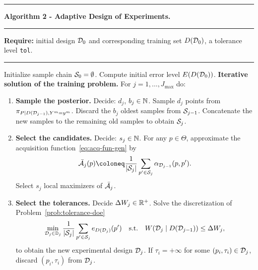 \par\noindent\rule[1mm]{\textwidth}{0.4pt}
 \makeatletter{}\makeatother\label{algo:AL}
\large{\textbf{Algorithm 2 - Adaptive Design of Experiments.} } \normalsize
\par\noindent\rule[2mm]{\textwidth}{0.2pt}
\textbf{Require:} initial design $\mathcal D_0$ and corresponding training set $D(\mathcal D_0)$, a tolerance level \texttt{tol}.
\par\noindent\rule[2mm]{\textwidth}{0.2pt}
Initialize sample chain $\mathcal S_0 = \emptyset$. \newline
Compute initial error level $E(D(\mathcal D_0))$. \newline
\textbf{Iterative solution of the training problem.}
For $j =1, \dots, J_{\max}$ do: 
\begin{enumerate}
    \item \textbf{Sample the posterior.} \newline
    Decide: $d_j$, $b_j \in \mathbb N$. \newline
    Sample $d_j$ points from $\pi_{P \mid D(\mathcal D_{j-1}), Y^m = y^m}$. \newline
    Discard the $b_j$ oldest samples from $\mathcal S_{j-1}$. \newline
    Concatenate the new samples to the remaining old samples to obtain $\mathcal S_j$.

    \item \textbf{Select the candidates.} \newline 
    Decide: $s_j \in \mathbb N$. \newline
    For any $p\in \Theta$, approximate the acquisition function~\ref{eq:acq-fun-gen} by
    \begin{equation}\label{eq:acq-fun-disc}
        \bar{\mc A}_j(p) \coloneq \frac{1}{|\mc S_j|}\sum_{p' \in \mc S_j} \alpha_{\mc D_{j-1}}(p, p') .
    \end{equation}
    Select $s_j$  local maximizers of $\bar{\mathcal A}_j$.

    \item \textbf{Select the tolerances.} \newline
    Decide $\Delta W_j \in \mathbb{R}^+$. \newline
    Solve the discretization of Problem~\ref{prob:tolerance-doe}
    \begin{equation}\label{prob:discrete-tol}       
        \min_{\mathcal D_{j} \in \mathbb D_j} \frac{1}{|\mathcal S_j|} \sum_{p' \in \mathcal S_j} e_{D(\mathcal D_j)}(p')  \quad \text{s.t.} 
        \quad W(\mathcal D_{j} \mid D(\mathcal D_{j-1}) ) \le \Delta W_j, 
    \end{equation} to obtain the new experimental design $\mathcal D_j $. \newline
    If $\tau_i = +\infty$ for some $(p_i, \tau_i) \in \mathcal D_j $, discard $(p_i, \tau_i) $ from $\mathcal D_j $.


\end{enumerate}
